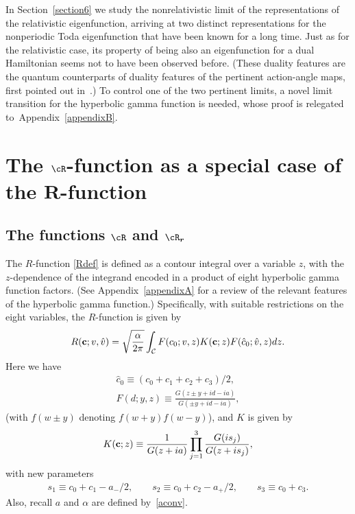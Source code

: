 \documentclass[pdftex]{sigma}
\numberwithin{equation}{section}
\begin{document}
In Section~\ref{section6} we study the nonrelativistic limit of the representations of the relativistic eigenfunction, arriving at two distinct representations for the nonperiodic Toda eigenfunction that have been known for a long time. Just as for the relativistic case, its property of being also an eigenfunction for a dual Hamiltonian seems not to have been observed before. (These duality features are the quantum counterparts of duality features of the pertinent action-angle maps, f\/irst pointed out in~\cite{toda}.) To control one of the two pertinent limits, a novel limit transition for the hyperbolic gamma function is needed, whose proof is relegated to~Appendix~\ref{appendixB}.


\section[The $\cR$-function as a special case of the $R$-function]{The $\boldsymbol{\cR}$-function as a special case of the $\boldsymbol{R}$-function}\label{section2}

\subsection[The functions $\cR$ and $\cR_r$]{The functions $\boldsymbol{\cR}$ and $\boldsymbol{\cR_r}$}\label{section2.1}

The $R$-function \eqref{Rdef} is def\/ined as a contour integral over a variable $z$, with the $z$-dependence of the integrand encoded in a product of eight hyperbolic gamma function factors.
(See Appendix~\ref{appendixA} for a review of the relevant features of the hyperbolic gamma function.)
Specif\/ically,
with suitable restrictions on the eight variables, the $R$-function is given by
\begin{gather}\label{R}
R({\bf c};v,\hat{v})=\sqrt{\frac{\alpha}{2\pi}}\int_{\cal
C}F(c_0;v,z)K({\bf c};z)F(\hat{c}_0;\hat{v},z)dz.
\end{gather}
Here we have
\begin{gather}
\hat{c}_0\equiv (c_0+c_1+c_2+c_3)/2,
\\
\label{F}
F(d;y,z)\equiv
\frac{G(z\pm y+id-ia)}{G(\pm y+id-ia)},
\end{gather}
(with $f(w\pm y)$ denoting $f(w+y)f(w-y)$), and $K$ is given by
\begin{gather}\label{K}
K({\bf c};z)\equiv
\frac{1}{G(z+ia)}\prod_{j=1}^3\frac{G(is_j)}{G(z+is_j)},
\end{gather}
with new parameters
\begin{gather}\label{defsj}
s_1\equiv c_0+c_1-a_{-}/2,\qquad s_2\equiv c_0+c_2-a_{+}/2,\qquad s_3\equiv
c_0+c_3.
\end{gather}
Also, recall $a$ and $\alpha$ are def\/ined by~\eqref{aconv}.
\end{document}
